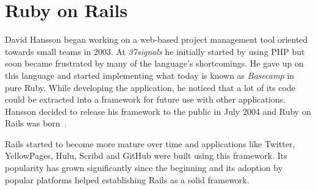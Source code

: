 \section{Ruby on Rails} %
\label{tech:sec:ruby_on_rails}
David Hansson began working on a web-based project management tool oriented towards small teams in 2003. At \textit{37signals} he initially started by using PHP but soon became frustrated by many of the language's shortcomings. He gave up on this language and started implementing what today is known as \textit{Basecamp} in pure Ruby. While developing the application, he noticed that a lot of its code could be extracted into a framework for future use with other applications. Hansson decided to release his framework to the public in July 2004 and Ruby on Rails was born~\cite{railssolutions}.

Rails started to become more mature over time and applications like Twitter, YellowPages, Hulu, Scribd and GitHub were built using this framework. Its popularity has grown significantly since the beginning and its adoption by popular platforms helped establishing Rails as a solid framework.

